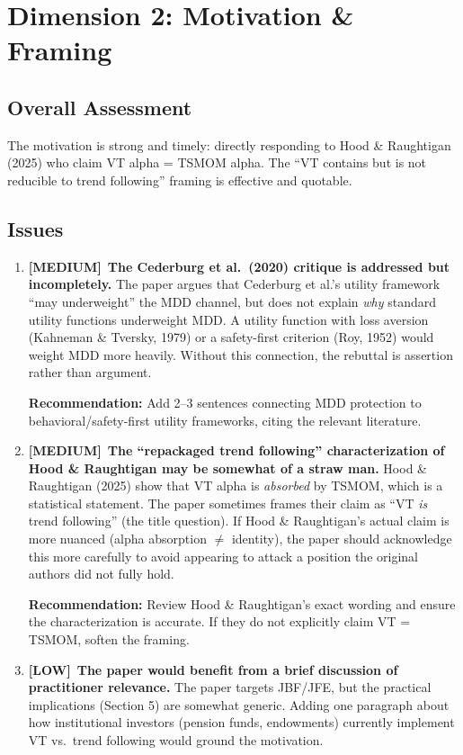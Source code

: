 \documentclass[12pt,a4paper]{article}
\newcommand{\MEDIUM}{\textcolor{medsev}{\textbf{[MEDIUM]}}}
\newcommand{\LOW}{\textcolor{lowsev}{\textbf{[LOW]}}}
\begin{document}
\section{Dimension 2: Motivation \& Framing}

\subsection*{Overall Assessment}
The motivation is strong and timely: directly responding to Hood \& Raughtigan (2025) who claim VT alpha = TSMOM alpha. The ``VT contains but is not reducible to trend following'' framing is effective and quotable.

\subsection*{Issues}

\begin{enumerate}[label=\textbf{2.\arabic*}]

\item \MEDIUM\ \textbf{The Cederburg et al.\ (2020) critique is addressed but incompletely.}
The paper argues that Cederburg et al.'s utility framework ``may underweight'' the MDD channel, but does not explain \textit{why} standard utility functions underweight MDD. A utility function with loss aversion (Kahneman \& Tversky, 1979) or a safety-first criterion (Roy, 1952) would weight MDD more heavily. Without this connection, the rebuttal is assertion rather than argument.

\textbf{Recommendation:} Add 2--3 sentences connecting MDD protection to behavioral/safety-first utility frameworks, citing the relevant literature.

\item \MEDIUM\ \textbf{The ``repackaged trend following'' characterization of Hood \& Raughtigan may be somewhat of a straw man.}
Hood \& Raughtigan (2025) show that VT alpha is \textit{absorbed} by TSMOM, which is a statistical statement. The paper sometimes frames their claim as ``VT \textit{is} trend following'' (the title question). If Hood \& Raughtigan's actual claim is more nuanced (alpha absorption $\neq$ identity), the paper should acknowledge this more carefully to avoid appearing to attack a position the original authors did not fully hold.

\textbf{Recommendation:} Review Hood \& Raughtigan's exact wording and ensure the characterization is accurate. If they do not explicitly claim VT = TSMOM, soften the framing.

\item \LOW\ \textbf{The paper would benefit from a brief discussion of practitioner relevance.}
The paper targets JBF/JFE, but the practical implications (Section 5) are somewhat generic. Adding one paragraph about how institutional investors (pension funds, endowments) currently implement VT vs.\ trend following would ground the motivation.

\end{enumerate}
\end{document}
